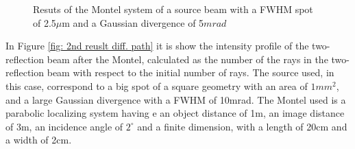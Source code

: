 \begin{figure}[]
%
\centering
%
%
\quad
%
%
\caption{Resuts of the Montel system of a source beam with a FWHM spot of 2.5$\mu $m and a Gaussian divergence of 5$mrad $}
%
\label{fig: reuslt diff. path}
%
\end{figure}
In Figure \ref{fig: 2nd reuslt diff. path} it is show the intensity profile of the two-reflection beam after the Montel, calculated as the number of the rays in the two-reflection beam with respect to the initial number of rays. The source used, in this case, correspond to a big spot of a square geometry with an area of $1mm^2 $, and a large Gaussian divergence with a FWHM of 10mrad. The Montel used is a parabolic localizing system having e an object distance of 1m, an image distance of 3m, an incidence angle of $2^{\circ} $ and a finite dimension, with a length of 20cm and a width of 2cm.
